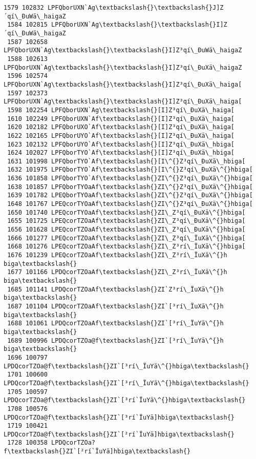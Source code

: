 \documentclass[11pt]{article}
\begin{document}
\begin{Verbatim}[commandchars=\\\{\}]
 1579 102832 LPFQborUXN`Ag\textbackslash{}\textbackslash{}J]Z´qí\_ÐuWä\_haigaZ
 1584 102815 LPFQborUXN`Ag\textbackslash{}\textbackslash{}I]Z´qí\_ÐuWä\_haigaZ
 1587 102658 LPFQborUXN`Ag\textbackslash{}\textbackslash{}I]Z³qí\_ÐuWä\_haigaZ
 1588 102613 LPFQborUXN`Ag\textbackslash{}\textbackslash{}I]Z³qí\_ÐuXä\_haigaZ
 1596 102574 LPFQborUXN`Ag\textbackslash{}\textbackslash{}I]Z³qí\_ÐuXä\_haiga[
 1597 102373 LPFQborUXN`Ag\textbackslash{}\textbackslash{}I]Z³qí\_ÐuXä\_haiga[
 1598 102254 LPFQborUXN`Ag\textbackslash{}[I]Z³qí\_ÐuXä\_haiga[
 1610 102249 LPFQborUXN`Af\textbackslash{}[I]Z³qí\_ÐuXä\_haiga[
 1620 102182 LPFQborUXO`Af\textbackslash{}[I]Z³qí\_ÐuXä\_haiga[
 1622 102165 LPFQborUYO`Af\textbackslash{}[I]Z³qí\_ÐuXä\_haiga[
 1623 102132 LPFQborUYO`Af\textbackslash{}[I]Z³qí\_ÐuXä\_hbiga[
 1624 102027 LPFQborTYO`Af\textbackslash{}[I]Z³qí\_ÐuXä\_hbiga[
 1631 101998 LPFQborTYO`Af\textbackslash{}[I\^{}Z³qí\_ÐuXä\_hbiga[
 1632 101975 LPFQborTYO`Af\textbackslash{}[I\^{}Z³qí\_ÐuXä\^{}hbiga[
 1636 101858 LPFQborTYO`Af\textbackslash{}ZI\^{}Z³qí\_ÐuXä\^{}hbiga[
 1638 101857 LPFQborTYOaAf\textbackslash{}ZI\^{}Z³qí\_ÐuXä\^{}hbiga[
 1639 101782 LPEQborTYOaAf\textbackslash{}ZI\^{}Z³qí\_ÐuXä\^{}hbiga[
 1648 101767 LPEQcorTYOaAf\textbackslash{}ZI\^{}Z³qí\_ÐuXä\^{}hbiga[
 1650 101740 LPEQcorTYOaAf\textbackslash{}ZI\_Z³qí\_ÐuXä\^{}hbiga[
 1655 101725 LPEQcorTZOaAf\textbackslash{}ZI\_Z³qí\_ÐuXä\^{}hbiga[
 1656 101628 LPEQcorTZOaAf\textbackslash{}ZI\_Z³qí\_ÐuXä\^{}hbiga[
 1666 101277 LPEQcorTZOaAf\textbackslash{}ZI\_Z³qí\_ÏuXä\^{}hbiga[
 1668 101276 LPEQcorTZOaAf\textbackslash{}ZI\_Z³rí\_ÏuXä\^{}hbiga[
 1676 101239 LPEQcorTZOaAf\textbackslash{}ZI\_Z³rí\_ÏuXä\^{}hbiga\textbackslash{}
 1677 101166 LPDQcorTZOaAf\textbackslash{}ZI\_Z³rí\_ÏuXä\^{}hbiga\textbackslash{}
 1685 101141 LPDQcorTZOaAf\textbackslash{}ZI`Z³rí\_ÏuXä\^{}hbiga\textbackslash{}
 1687 101104 LPDQcorTZOaAf\textbackslash{}ZI`[³rí\_ÏuXä\^{}hbiga\textbackslash{}
 1688 101061 LPDQcorTZOaAf\textbackslash{}ZI`[³rí\_ÏuYä\^{}hbiga\textbackslash{}
 1689 100996 LPDQcorTZOa@f\textbackslash{}ZI`[³rí\_ÏuYä\^{}hbiga\textbackslash{}
 1696 100797 LPDQcorTZOa@f\textbackslash{}ZI`[³rí\_ÏuYä\^{}hbiga\textbackslash{}
 1701 100600 LPDQcorTZOa@f\textbackslash{}ZI`[³rí\_ÏuYä\^{}hbiga\textbackslash{}
 1705 100597 LPDQcorTZOa@f\textbackslash{}ZI`[³rí`ÏuYä\^{}hbiga\textbackslash{}
 1708 100576 LPDQcorTZOa@f\textbackslash{}ZI`[³rí`ÏuYä]hbiga\textbackslash{}
 1719 100421 LPDQcorTZOa@f\textbackslash{}ZI`[²rí`ÏuYä]hbiga\textbackslash{}
 1728 100358 LPDQcorTZOa?f\textbackslash{}ZI`[²rí`ÏuYä]hbiga\textbackslash{}

\end{Verbatim}
\end{document}
